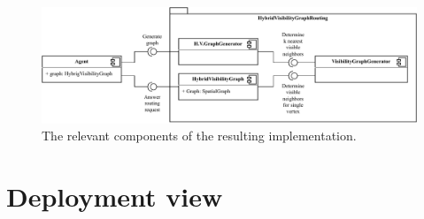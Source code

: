 	\begin{figure}[h]
		\begin{figcenter}
			\includegraphics[width=\textwidth]{images/components.pdf}
		\end{figcenter}
		\caption{The relevant components of the resulting implementation.}
	\end{figure}

\section{Deployment view}


